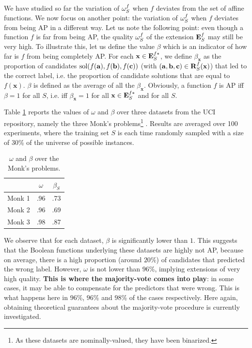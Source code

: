 We have studied so far the variation of $\omega_{S}^{f}$ when $f$ deviates from
the set of affine functions. We now focus on another point: the variation of
$\omega_{S}^{f}$ when $f$ deviates from being AP in a different way.
Let us note the following point: even though a function $f$ is far from being
AP, the quality $\omega_{S}^{f}$ of the extension $\mathbf{E}_{S}^{f}$ may still be very
high. To illustrate this, let us define the value $\beta$ which is an indicator
of how far is $f$ from being completely AP.  For each $\mathbf{x} \in
\mathbf{E}_{S}^{f*}$, we define $\beta_\mathbf{x}$ as the proportion of
candidates $\text{sol}(f(\mathbf{a}), f(\mathbf{b}), f(\mathbf{c}))$ (with
$(\mathbf{a}, \mathbf{b}, \mathbf{c}) \in \mathbf{R}_{S}^{f}(\mathbf{x})$) that led to the correct
label, i.e. the proportion of candidate solutions that are equal to
$f(\mathbf{x})$. $\beta$ is defined as the average of all the
$\beta_\mathbf{x}$.  Obviously, a function $f$ is AP iff $\beta = 1$ for all
$S$, i.e. iff $\beta_\mathbf{x} = 1$ for all $\mathbf{x} \in \mathbf{E}_{S}^{f*}$
and for all $S$.

Table \ref{table_monks} reports the values of $\omega$ and $\beta$ over three
datasets from the UCI repository, namely the three Monk's problems\footnote{As
these datasets are nominally-valued, they have been binarized.} \cite{UCIrepo}.
Results are averaged over 100 experiments, where the training set $S$ is each
time randomly sampled with a size of $30$\% of the universe of possible
instances.

\begin{table}
\centering
\begin{tabular}{ c  c  c }
\toprule
  & $\omega$  & $\beta_S$ \\
\midrule
Monk 1 & .96 & .73 \\
Monk 2 & .96 & .69 \\
Monk 3 & .98 & .87 \\
\bottomrule
\end{tabular}
\caption{$\omega$ and $\beta$ over the Monk's problems.}
\label{table_monks}
\end{table}

We observe that for each dataset, $\beta$ is significantly lower than $1$.
This suggests that the Boolean functions underlying these datasets are highly
not AP, because on average, there is a high proportion (around $20$\%) of
candidates that predicted the wrong label. However, $\omega$ is not lower than
$96$\%, implying extensions of very high quality.  \textbf{This is where the
majority-vote comes into play}: in some cases, it may be able to compensate for
the predictors that were wrong.  This is what happens here in $96$\%, $96$\%
and $98$\% of the cases respectively. Here again, obtaining theoretical
guarantees about the majority-vote procedure is currently investigated.

